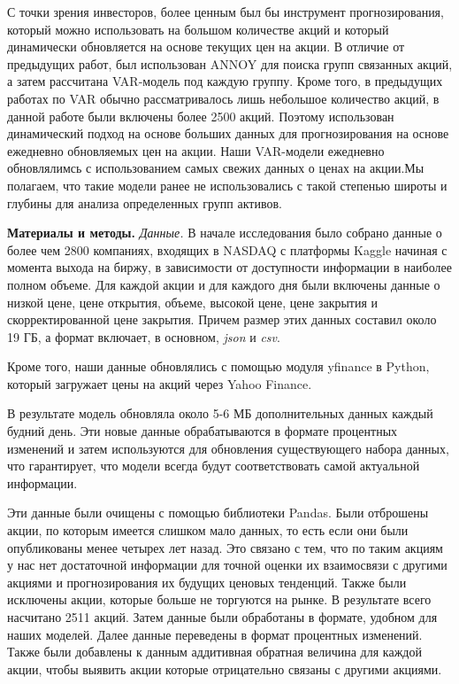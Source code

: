 {С точки зрения инвесторов, более ценным был бы инструмент
прогнозирования, который можно использовать на большом количестве акций
и который динамически обновляется на основе текущих цен на акции. В
отличие от предыдущих работ, был использован ANNOY для поиска групп
связанных акций, а затем рассчитана VAR-модель под каждую группу. Кроме
того, в предыдущих работах по VAR обычно рассматривалось лишь небольшое
количество акций, в данной работе были включены более 2500 акций.
Поэтому использован динамический подход на основе больших данных для
прогнозирования на основе ежедневно обновляемых цен на акции. Наши
VAR-модели ежедневно обновлялимсь с использованием самых свежих данных о
ценах на акции.Мы полагаем, что такие модели ранее не использовались с
такой степенью широты и глубины для анализа определенных групп активов.

{\bfseries Материалы и методы.} \emph{Данные.} В начале исследования было
собрано данные о более чем 2800 компаниях, входящих в NASDAQ с платформы
Kaggle начиная с момента выхода на биржу, в зависимости от доступности
информации в наиболее полном объеме. Для каждой акции и для каждого дня
были включены данные о низкой цене, цене открытия, объеме, высокой цене,
цене закрытия и скорректированной цене закрытия. Причем размер этих
данных составил около 19 ГБ, а формат включает, в основном, \emph{json}
и \emph{csv}.

Кроме того, наши данные обновлялись с помощью модуля yfinance в Python,
который загружает цены на акций через Yahoo Finance.

В результате модель обновляла около 5-6 МБ дополнительных данных каждый
будний день. Эти новые данные обрабатываются в формате процентных
изменений и затем используются для обновления существующего набора
данных, что гарантирует, что модели всегда будут соответствовать самой
актуальной информации.

Эти данные были очищены с помощью библиотеки Pandas. Были отброшены
акции, по которым имеется слишком мало данных, то есть если они были
опубликованы менее четырех лет назад. Это связано с тем, что по таким
акциям у нас нет достаточной информации для точной оценки их взаимосвязи
с другими акциями и прогнозирования их будущих ценовых тенденций. Также
были исключены акции, которые больше не торгуются на рынке. В результате
всего насчитано 2511 акций. Затем данные были обработаны в формате,
удобном для наших моделей. Далее данные переведены в формат процентных
изменений. Также были добавлены к данным аддитивная обратная величина
для каждой акции, чтобы выявить акции которые отрицательно связаны с
другими акциями.

}
